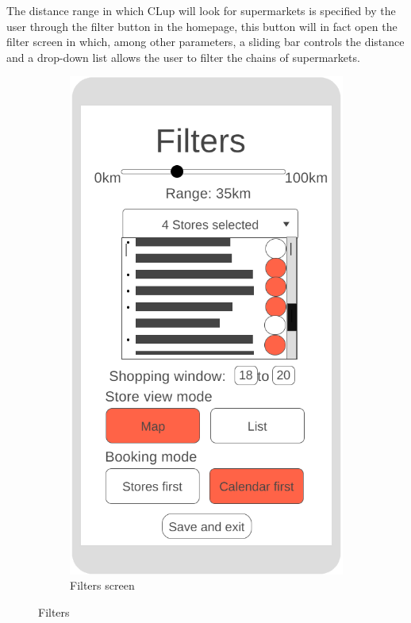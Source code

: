 The distance range in which CLup will look for supermarkets is specified by the user through the filter button in the homepage, this button will in fact open the filter screen in which, among other parameters, a sliding bar controls the distance and a drop-down list allows the user to filter the chains of supermarkets.\newline
\begin{figure}[h!]
	\centering
	\begin{subfigure}[b]{0.3\textwidth}
		\includegraphics[width=\linewidth]{../Diagrams/WireframesCLup/Filters.png}
		\caption{Filters screen}
		\label{fig:WfFilters}
	\end{subfigure}
	\caption{Filters}
	\label{fig:WireframesFilters}
\end{figure}
